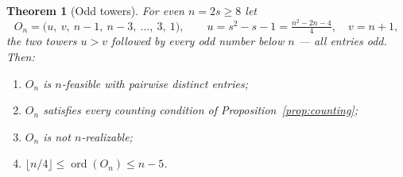 \documentclass[11pt]{article}
\newtheorem{theorem}{Theorem}[section]
\theoremstyle{definition}
\theoremstyle{remark}
\newcommand{\ord}{\operatorname{ord}}
\begin{document}
\begin{theorem}[Odd towers]\label{thm:oddtowers}
For even $n=2s\ge8$ let
\[
O_n=\bigl(u,\ v,\ n-1,\ n-3,\ \dots,\ 3,\ 1\bigr),\qquad
u=s^2-s-1=\tfrac{n^2-2n-4}{4},\quad v=n+1,
\]
the two towers $u>v$ followed by every odd number below $n$ --- all entries odd.
Then:
\begin{enumerate}[label=(\alph*),itemsep=1pt]
\item $O_n$ is $n$-feasible with pairwise distinct entries;
\item $O_n$ satisfies every counting condition of Proposition~\ref{prop:counting};
\item $O_n$ is not $n$-realizable;
\item $\lfloor n/4\rfloor\le\ord(O_n)\le n-5$.
\end{enumerate}
\end{theorem}
\end{document}
